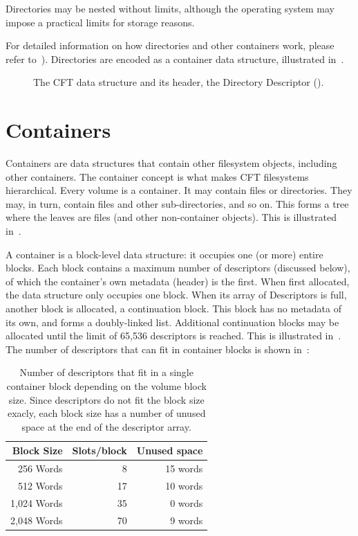 Directories may be nested without limits, although the operating system may
impose a practical limits for storage reasons.

For detailed information on how directories and other containers work, please
refer to~). Directories are encoded as a 
container data structure, illustrated in~.


\begin{figure}
 \centering
 \caption[CFT Directory data structure]{\label{fig:fs-directory} The
   CFT  data structure and its header, the Directory
   Descriptor ().}
\end{figure}





\section{Containers}
\label{sec:fs-containers}

Containers are data structures that contain other filesystem objects, including
other containers. The container concept is what makes CFT filesystems
hierarchical. Every \gls{volume} is a container. It may contain files or
directories. They may, in turn, contain files and other sub-directories, and so
on. This forms a tree where the leaves are files (and other non-container
objects). This is illustrated in~.

A container is a block-level data structure: it occupies one (or more) entire
blocks. Each block contains a maximum number of \glspl{descriptor} (discussed
below), of which the container's own metadata (header) is the first. When first
allocated, the data structure only occupies one block. When its array of
Descriptors is full, another block is allocated, a continuation block. This
block has no metadata of its own, and forms a doubly-linked list. Additional
continuation blocks may be allocated until the limit of 65,536 descriptors is
reached. This is illustrated in~. The number of
descriptors that can fit in container blocks is shown
in~:

\begin{table}[htb]
  \centering
  \zebra
  \begin{tabular}{rrr}
    Block Size & Slots/block & Unused space \\
    \hline
    256 Words   &  8 & 15 words\\
    512 Words   & 17 & 10 words\\
    1,024 Words & 35 &  0 words\\
    2,048 Words & 70 &  9 words\\
    \hline
  \end{tabular}
  \caption[Number of Descriptors by Block Size]{\label{table:fs-desc-bs} Number
    of descriptors that fit in a single container block depending on the volume
    block size. Since descriptors do not fit the block size exacly, each block
    size has a number of unused space at the end of the descriptor array.}
\end{table}

